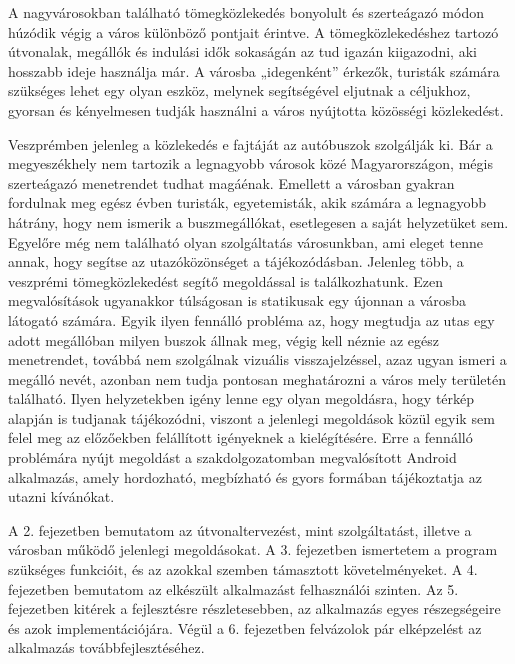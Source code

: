 
A nagyvárosokban található tömegközlekedés bonyolult és szerteágazó módon húzódik végig a város különböző pontjait érintve. 
A tömegközlekedéshez tartozó útvonalak, megállók és indulási idők sokaságán az tud igazán kiigazodni, aki hosszabb ideje használja már. 
A városba „idegenként” érkezők, turisták számára szükséges lehet egy olyan eszköz, melynek segítségével eljutnak a céljukhoz, gyorsan és kényelmesen tudják használni a város nyújtotta közösségi közlekedést. 

Veszprémben jelenleg a közlekedés e fajtáját az autóbuszok szolgálják ki. 
Bár a megyeszékhely nem tartozik a legnagyobb városok közé Magyarországon, mégis szerteágazó menetrendet tudhat magáénak. 
Emellett a városban gyakran fordulnak meg egész évben turisták, egyetemisták, akik számára a legnagyobb hátrány, hogy nem ismerik a buszmegállókat, esetlegesen a saját helyzetüket sem. 
Egyelőre még nem található olyan szolgáltatás városunkban, ami eleget tenne annak, hogy segítse az utazóközönséget a tájékozódásban.
Jelenleg több, a veszprémi tömegközlekedést segítő megoldással is találkozhatunk. 
Ezen megvalósítások ugyanakkor túlságosan is statikusak egy újonnan a városba látogató számára. 
Egyik ilyen fennálló probléma az, hogy megtudja az utas egy adott megállóban milyen buszok állnak meg, végig kell néznie az egész menetrendet, továbbá nem szolgálnak vizuális visszajelzéssel, azaz ugyan ismeri a megálló nevét, azonban nem tudja pontosan meghatározni a város mely területén található. 
Ilyen helyzetekben igény lenne egy olyan megoldásra, hogy térkép alapján is tudjanak tájékozódni, viszont a jelenlegi megoldások közül egyik sem felel meg az előzőekben felállított igényeknek a kielégítésére.
Erre a fennálló problémára nyújt megoldást a szakdolgozatomban megvalósított Android alkalmazás, amely hordozható, megbízható és gyors formában tájékoztatja az utazni kívánókat. 

A 2. fejezetben bemutatom az útvonaltervezést, mint szolgáltatást, illetve a városban működő jelenlegi megoldásokat. 
A 3. fejezetben ismertetem a program szükséges funkcióit, és az azokkal szemben támasztott követelményeket.
A 4. fejezetben bemutatom az elkészült alkalmazást felhasználói szinten.
Az 5. fejezetben kitérek a fejlesztésre részletesebben, az alkalmazás egyes részegségeire és azok implementációjára. 
Végül a 6. fejezetben felvázolok pár elképzelést az alkalmazás továbbfejlesztéséhez.
\newpage
